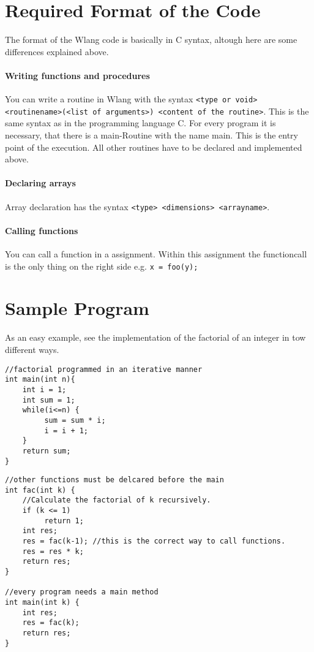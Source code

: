 \documentclass[parskip=full]{memoir}
\begin{document}
\section{Required Format of the Code}
The format of the Wlang code is basically in C syntax, altough here are some differences explained above.
\paragraph{Writing functions and procedures}
You can write a routine in Wlang with the syntax \texttt{<type or void> <routinename>(<list of arguments>) <content of the routine>}. This is the same syntax as in the programming language C. For every program it is necessary, that there is a main-Routine with the name main. This is the entry point of the execution. All other routines have to be declared and implemented above.
\paragraph{Declaring arrays}
Array declaration has the syntax \texttt{<type> <dimensions> <arrayname>}. 
\paragraph{Calling functions}
You can call a function in a assignment. Within this assignment the functioncall is the only thing on the right side e.g. \texttt{x = foo(y);}
\section{Sample Program}
As an easy example, see the implementation of the factorial of an integer in tow different ways.
\begin{verbatim}
//factorial programmed in an iterative manner
int main(int n){
    int i = 1;
    int sum = 1;
    while(i<=n) {
         sum = sum * i;
         i = i + 1;
    }
    return sum;
}
\end{verbatim}
\begin{verbatim}
//other functions must be delcared before the main
int fac(int k) {
    //Calculate the factorial of k recursively.
    if (k <= 1)
         return 1;
    int res; 
    res = fac(k-1); //this is the correct way to call functions.
    res = res * k;
    return res;
}

//every program needs a main method
int main(int k) {
    int res;
    res = fac(k);
    return res;
}
\end{verbatim}
\end{document}
